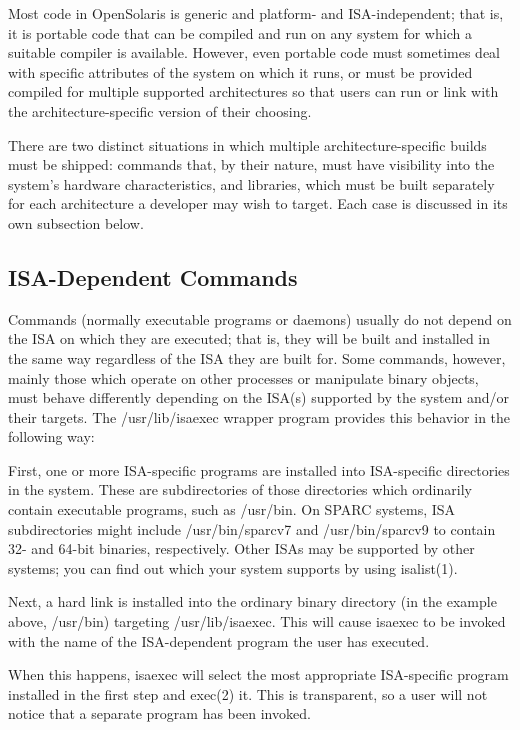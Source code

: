 \documentclass{article}
\begin{document}
Most code in OpenSolaris is generic and platform- and ISA-independent; that is,
it is portable code that can be compiled and run on any system for which a
suitable compiler is available. However, even portable code must sometimes deal
with specific attributes of the system on which it runs, or must be provided
compiled for multiple supported architectures so that users can run or link
with the architecture-specific version of their choosing.

There are two distinct situations in which multiple architecture-specific
bui\-lds must be shipped: commands that, by their nature, must have visibility
into the system's hardware characteristics, and libraries, which must be built
separately for each architecture a developer may wish to target. Each case is
discussed in its own subsection below.

\subsection*{ISA-Dependent Commands}

Commands (normally executable programs or daemons) usually do not depend on the
ISA on which they are executed; that is, they will be built and installed in
the same way regardless of the ISA they are built for. Some commands, however,
mainly those which operate on other processes or manipulate binary objects,
must behave differently depending on the ISA(s) supported by the system and/or
their targets. The /usr/lib/isaexec wrapper program provides this behavior in
the following way:

First, one or more ISA-specific programs are installed into ISA-specific
directories in the system. These are subdirectories of those directories which
ordinarily contain executable programs, such as /usr/bin. On SPARC systems, ISA
subdirectories might include /usr/bin/sparcv7 and /usr/bin/sparcv9 to contain
32- and 64-bit binaries, respectively. Other ISAs may be supported by other
systems; you can find out which your system supports by using isalist(1).

Next, a hard link is installed into the ordinary binary directory (in the
example above, /usr/bin) targeting /usr/lib/isaexec. This will cause isaexec to
be invoked with the name of the ISA-dependent program the user has executed.

When this happens, isaexec will select the most appropriate ISA-specific
program installed in the first step and exec(2) it. This is transparent, so a
user will not notice that a separate program has been invoked.
\end{document}
